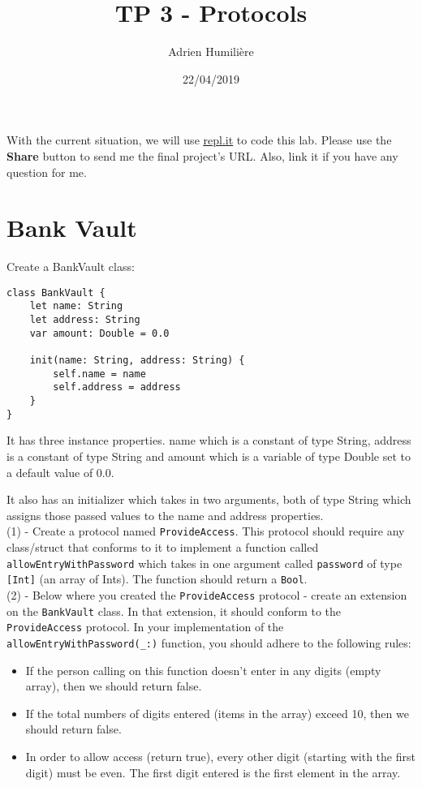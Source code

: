 \documentclass[a4paper,11pt]{scrartcl}
\begin{document}
\newcommand{\mytitle}{\textsf{\textbf{TP 3 - Protocols}}}
\title{\mytitle}
\author{Adrien Humilière}
\date{22/04/2019}

\maketitle

With the current situation, we will use \href{https://repl.it/languages/swift}{\underline{repl.it}} to code this lab. Please use the \textbf{Share} button to send me the final project's URL. Also, link it if you have any question for me.

\section{Bank Vault}

Create a BankVault class:

\begin{lstlisting}
class BankVault {
    let name: String
    let address: String
    var amount: Double = 0.0
    
    init(name: String, address: String) {
        self.name = name
        self.address = address
    }
}
\end{lstlisting}

It has three instance properties. name which is a constant of type String, address is a constant of type String and amount which is a variable of type Double set to a default value of 0.0.

It also has an initializer which takes in two arguments, both of type String which assigns those passed values to the name and address properties.\\

(1) - Create a protocol named \texttt{ProvideAccess}. This protocol should require any class/struct that conforms to it to implement a function called \texttt{allowEntryWithPassword} which takes in one argument called \texttt{password} of type \texttt{[Int]} (an array of Ints). The function should return a \texttt{Bool}.\\

(2) - Below where you created the \texttt{ProvideAccess} protocol - create an extension on the \texttt{BankVault} class. In that extension, it should conform to the \texttt{ProvideAccess} protocol. In your implementation of the \texttt{allowEntryWithPassword(\_:)} function, you should adhere to the following rules:

\begin{itemize}
\item If the person calling on this function doesn't enter in any digits (empty array), then we should return false.
\item If the total numbers of digits entered (items in the array) exceed 10, then we should return false.
\item In order to allow access (return true), every other digit (starting with the first digit) must be even. The first digit entered is the first element in the array.
\end{itemize}
\end{document}
